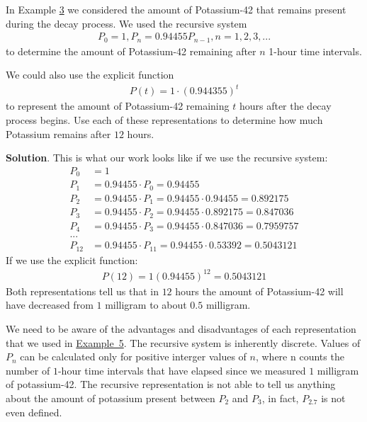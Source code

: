 \documentclass[10pt,]{book}
\theoremstyle{ptxdefinitionnotitle}
\theoremstyle{ptxdefinitiontitle}
\theoremstyle{ptxdefinitionnotitle}
\theoremstyle{ptxdefinitiontitle}
\theoremstyle{ptxdefinitionnotitle}
\theoremstyle{ptxdefinitiontitle}
\numberwithin{equation}{section}
\begin{document}
\begin{example}\label{example-continuous-discrete}
\hypertarget{p-96}{}%
In Example \hyperref[example-radioactive-decay]{3} we considered the amount of Potassium-42 that remains present during the decay process.  We used the recursive system%
%
\begin{gather*}
P_0=1, P_n=0.94455P_{n-1}, n=1,2,3,...
\end{gather*}
\hypertarget{p-97}{}%
to determine the amount of Potassium-42 remaining after \(n\) 1-hour time intervals.%
\par
\hypertarget{p-98}{}%
We could also use the explicit function%
%
\begin{gather*}
P(t)=1 \cdot (0.944355)^t
\end{gather*}
\hypertarget{p-99}{}%
to represent the amount of Potassium-42 remaining \(t\) hours after the decay process begins. Use each of these representations to determine how much Potassium remains after \(12\) hours.%
\par\smallskip%
\noindent\textbf{Solution}.\hypertarget{solution-8}{}\quad%
\hypertarget{p-100}{}%
This is what our work looks like if we use the recursive system:%
%
\begin{align*}
P_0&=1\\
P_1&=0.94455 \cdot P_0 = 0.94455\\
P_2&=0.94455 \cdot P_1 = 0.94455 \cdot 0.94455 = 0.892175\\
P_3&=0.94455 \cdot P_2 = 0.94455 \cdot 0.892175 = 0.847036\\
P_4&=0.94455 \cdot P_3 = 0.94455 \cdot 0.847036 = 0.7959757\\
...\\
P_{12}&=0.94455 \cdot P_{11} = 0.94455 \cdot 0.53392 = 0.5043121
\end{align*}
\hypertarget{p-101}{}%
If we use the explicit function:%
%
\begin{gather*}
P(12)=1(0.94455)^{12} = 0.5043121
\end{gather*}
\hypertarget{p-102}{}%
Both representations tell us that in \(12\) hours the amount of Potassium-42 will have decreased from \(1\) milligram to about \(0.5\) milligram.%
\par
\hypertarget{p-103}{}%
We need to be aware of the advantages and disadvantages of each representation that we used in \hyperref[example-one-time-bank-desposit]{Example~5}. The recursive system is inherently discrete.  Values of \(P_n\) can be calculated only for positive interger values of \(n\), where n counts the number of \(1\)-hour time intervals that have elapsed since we measured \(1\) milligram of potassium-42. The recursive representation is not able to tell us anything about the amount of potassium present between \(P_2\) and \(P_3\), in fact, \(P_{2.7}\) is not even defined.%

\end{example}
\end{document}
